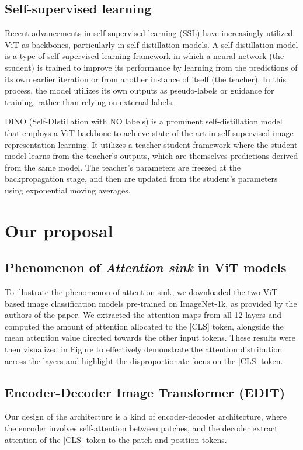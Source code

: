 \documentclass[anon,12pt]{colt2024} %
\begin{document}
\subsection{Self-supervised learning}
Recent advancements in self-supervised learning (SSL) \cite{he2022masked,wang2023image,caron2021emerging,oquab2024dinov} have increasingly utilized ViT as backbones, particularly in self-distillation models.
A self-distillation model is a type of self-supervised learning framework in which a neural network (the student) is trained to improve its performance by learning from the predictions of its own earlier iteration or from another instance of itself (the teacher).
In this process, the model utilizes its own outputs as pseudo-labels or guidance for training, rather than relying on external labels.

DINO (Self-DIstillation with NO labels) \cite{caron2021emerging,oquab2024dinov} is a prominent self-distillation model that employs a ViT backbone to achieve state-of-the-art in self-supervised image representation learning. It utilizes a teacher-student framework where the student model learns from the teacher's outputs, which are themselves predictions derived from the same model. The teacher's parameters are freezed at the backpropagation stage, and then are updated from the student's parameters using exponential moving averages.


\section{Our proposal}

\subsection{Phenomenon of \textit{Attention sink} in ViT models}

To illustrate the phenomenon of attention sink, we downloaded the two ViT-based image classification models \cite{touvron2021training} pre-trained on ImageNet-1k, as provided by the authors of the paper. We extracted the attention maps from all 12 layers and computed the amount of attention allocated to the [CLS] token, alongside the mean attention value directed towards the other input tokens. 
These results were then visualized in Figure to effectively demonstrate the attention distribution across the layers and highlight the disproportionate focus on the [CLS] token.




\subsection{Encoder-Decoder Image Transformer (EDIT)}
Our design of the architecture is a kind of encoder-decoder architecture, where the encoder involves self-attention between patches, and the decoder extract attention of the [CLS] token to the patch and position tokens.
\end{document}
